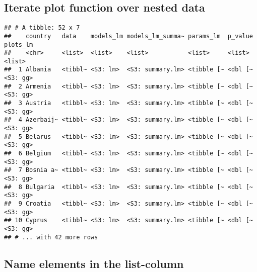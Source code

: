 \documentclass[]{article}
\newenvironment{Shaded}{\begin{snugshade}}{\end{snugshade}}
\newcommand{\KeywordTok}[1]{\textcolor[rgb]{0.13,0.29,0.53}{\textbf{#1}}}
\newcommand{\DataTypeTok}[1]{\textcolor[rgb]{0.13,0.29,0.53}{#1}}
\newcommand{\StringTok}[1]{\textcolor[rgb]{0.31,0.60,0.02}{#1}}
\newcommand{\OperatorTok}[1]{\textcolor[rgb]{0.81,0.36,0.00}{\textbf{#1}}}
\newcommand{\NormalTok}[1]{#1}
\begin{document}
\subsection{Iterate plot function over nested
data}\label{iterate-plot-function-over-nested-data}

\begin{Shaded}
\end{Shaded}

\begin{verbatim}
## # A tibble: 52 x 7
##    country   data    models_lm models_lm_summa~ params_lm  p_value plots_lm
##    <chr>     <list>  <list>    <list>           <list>     <list>  <list>  
##  1 Albania   <tibbl~ <S3: lm>  <S3: summary.lm> <tibble [~ <dbl [~ <S3: gg>
##  2 Armenia   <tibbl~ <S3: lm>  <S3: summary.lm> <tibble [~ <dbl [~ <S3: gg>
##  3 Austria   <tibbl~ <S3: lm>  <S3: summary.lm> <tibble [~ <dbl [~ <S3: gg>
##  4 Azerbaij~ <tibbl~ <S3: lm>  <S3: summary.lm> <tibble [~ <dbl [~ <S3: gg>
##  5 Belarus   <tibbl~ <S3: lm>  <S3: summary.lm> <tibble [~ <dbl [~ <S3: gg>
##  6 Belgium   <tibbl~ <S3: lm>  <S3: summary.lm> <tibble [~ <dbl [~ <S3: gg>
##  7 Bosnia a~ <tibbl~ <S3: lm>  <S3: summary.lm> <tibble [~ <dbl [~ <S3: gg>
##  8 Bulgaria  <tibbl~ <S3: lm>  <S3: summary.lm> <tibble [~ <dbl [~ <S3: gg>
##  9 Croatia   <tibbl~ <S3: lm>  <S3: summary.lm> <tibble [~ <dbl [~ <S3: gg>
## 10 Cyprus    <tibbl~ <S3: lm>  <S3: summary.lm> <tibble [~ <dbl [~ <S3: gg>
## # ... with 42 more rows
\end{verbatim}

\subsection{Name elements in the
list-column}\label{name-elements-in-the-list-column}

\begin{Shaded}
\end{Shaded}
\end{document}
